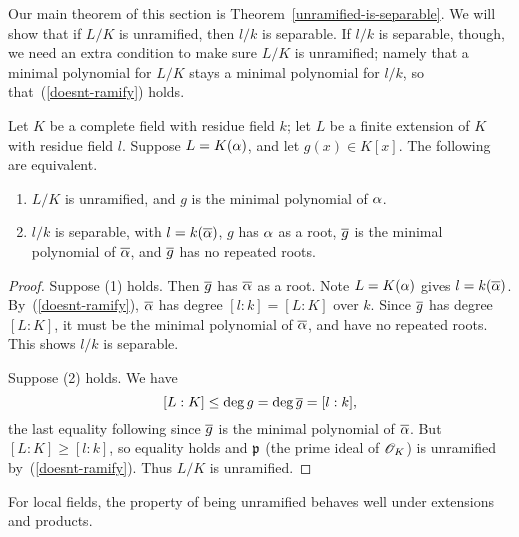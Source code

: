 Our main theorem of this section is Theorem~\ref{unramified-is-separable}. We will show that if $L/K$ is unramified, then $l/k$ is separable. If $l/k$ is separable, though, we need an extra condition to make sure $L/K$ is unramified; namely that a minimal polynomial for $L/K$ stays a minimal polynomial for $l/k$, so that~(\ref{doesnt-ramify}) holds.
\begin{pr}
Let $K$ be a complete field with residue field $k$; let $L$ be a finite extension of $K$ with residue field $l$. Suppose $L=K(\alpha)$, and let $g(x)\in K[x]$.
The following are equivalent.
\begin{enumerate}
\item $L/K$ is unramified, and $g$ is the minimal polynomial of $\alpha$.
\item $l/k$ is separable, with $l=k(\overline{\alpha})$, $g$ has $\alpha$ as a root, $\overline{g}$ is the minimal polynomial of $\overline{\alpha}$, and $\overline{g}$ has no repeated roots.
\end{enumerate}
\end{pr}
\begin{proof}
Suppose (1) holds. Then $\overline{g}$ has $\overline{\alpha}$ as a root. Note $L=K(\alpha)$ gives $l=k(\overline{\alpha})$. By~(\ref{doesnt-ramify}), $\overline{\alpha}$ has degree $[l:k]=[L:K]$ over $k$. Since $\overline{g}$ has degree $[L:K]$, it must be the minimal polynomial of $\overline{\alpha}$, and have no repeated roots. This shows $l/k$ is separable.

Suppose (2) holds. We have
\[
[L:K]\le \deg g=\deg \overline{g}= [l:k],
\]
the last equality following since $\overline{g}$ is the minimal polynomial of $\overline{\alpha}$. %
But $[L:K]\ge[l:k]$, so equality holds and $\mathfrak{p}$ (the prime ideal of $\mathscr{O}_K$) is unramified by~(\ref{doesnt-ramify}). %
Thus $L/K$ is unramified.
\end{proof}
For local fields, the property of being unramified behaves well under extensions and products.
